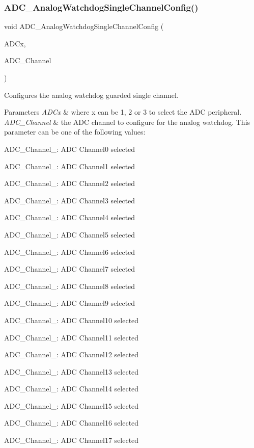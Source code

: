 \subsubsection{\texorpdfstring{A\+D\+C\+\_\+\+Analog\+Watchdog\+Single\+Channel\+Config()}{ADC\_AnalogWatchdogSingleChannelConfig()}}
{\footnotesize\ttfamily void A\+D\+C\+\_\+\+Analog\+Watchdog\+Single\+Channel\+Config (\begin{DoxyParamCaption}\item[{\hyperlink{struct_a_d_c___type_def}{A\+D\+C\+\_\+\+Type\+Def} $\ast$}]{A\+D\+Cx,  }\item[{uint8\+\_\+t}]{A\+D\+C\+\_\+\+Channel }\end{DoxyParamCaption})}



Configures the analog watchdog guarded single channel. 


\begin{DoxyParams}{Parameters}
{\em A\+D\+Cx} & where x can be 1, 2 or 3 to select the A\+DC peripheral. \\
\hline
{\em A\+D\+C\+\_\+\+Channel} & the A\+DC channel to configure for the analog watchdog. This parameter can be one of the following values\+: \begin{DoxyItemize}
\item A\+D\+C\+\_\+\+Channel\+\_\+: A\+DC Channel0 selected \item A\+D\+C\+\_\+\+Channel\+\_\+: A\+DC Channel1 selected \item A\+D\+C\+\_\+\+Channel\+\_\+: A\+DC Channel2 selected \item A\+D\+C\+\_\+\+Channel\+\_\+: A\+DC Channel3 selected \item A\+D\+C\+\_\+\+Channel\+\_\+: A\+DC Channel4 selected \item A\+D\+C\+\_\+\+Channel\+\_\+: A\+DC Channel5 selected \item A\+D\+C\+\_\+\+Channel\+\_\+: A\+DC Channel6 selected \item A\+D\+C\+\_\+\+Channel\+\_\+: A\+DC Channel7 selected \item A\+D\+C\+\_\+\+Channel\+\_\+: A\+DC Channel8 selected \item A\+D\+C\+\_\+\+Channel\+\_\+: A\+DC Channel9 selected \item A\+D\+C\+\_\+\+Channel\+\_\+: A\+DC Channel10 selected \item A\+D\+C\+\_\+\+Channel\+\_\+: A\+DC Channel11 selected \item A\+D\+C\+\_\+\+Channel\+\_\+: A\+DC Channel12 selected \item A\+D\+C\+\_\+\+Channel\+\_\+: A\+DC Channel13 selected \item A\+D\+C\+\_\+\+Channel\+\_\+: A\+DC Channel14 selected \item A\+D\+C\+\_\+\+Channel\+\_\+: A\+DC Channel15 selected \item A\+D\+C\+\_\+\+Channel\+\_\+: A\+DC Channel16 selected \item A\+D\+C\+\_\+\+Channel\+\_\+: A\+DC Channel17 selected \end{DoxyItemize}
\\
\hline
\end{DoxyParams}

